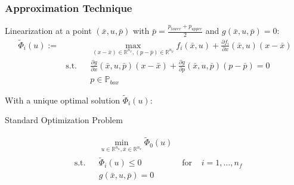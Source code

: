 \begin{frame}
	\frametitle{Approximation Technique}

\begin{block}{Linearization}
at a point $(\bar{x}, u, \bar{p})$ with $\bar{p}=\frac{p_{lower}+p_{upper}}{2}$ and $g(\bar{x}, u, \bar{p})=0$:	
	\begin{align*}
	\tilde{\Phi}_{i}(u):= &&& \max_{(x-\bar{x})\in\mathbb{R}^{n_{x}}, (p-\bar{p})\in\mathbb{R}^{n_{p}}} f_{i}(\bar{x}, u)+\frac{\partial f_{i}}{\partial x}(\bar{x}, u)(x-\bar{x}) \\
	& \text{s.t.} && \frac{\partial g}{\partial x}(\bar{x}, u, \bar{p})(x-\bar{x})+\frac{\partial g}{\partial p}(\bar{x}, u, \bar{p})(p-\bar{p})=0 \\
	&&& p\in\mathbb{P}_{box}
	\end{align*}

\end{block}	
	


With a unique optimal solution $\tilde{\Phi}_{i}(u)$: 
\begin{block}{Standard Optimization Problem}	

\begin{align*}
&&&\min_{u\in\mathbb{R}^{n_{u}}, \bar{x}\in\mathbb{R}^{n_{x}}} \tilde{\Phi}_{0}(u)\\
&\text{s.t.} &&  \tilde{\Phi}_{i}(u)\leq 0 & \text{ for } & i=1,\ldots,n_{f}\\
&&& g(\bar{x}, u, \bar{p})=0
\end{align*}
\end{block} 
	
\end{frame}
